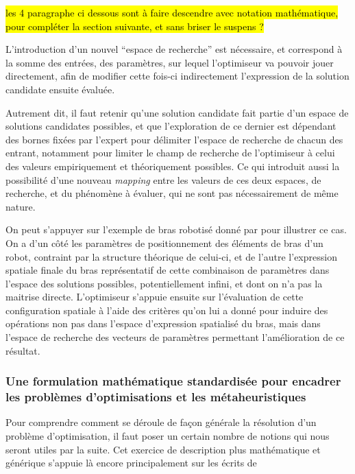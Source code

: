 \hl{les 4 paragraphe ci dessous sont à faire descendre avec notation mathématique, pour compléter la section suivante, et sans briser le suspens ?}

L'introduction d'un nouvel \enquote{espace de recherche} est nécessaire, et  correspond à la somme des entrées, des paramètres, sur lequel l'optimiseur va pouvoir jouer directement, afin de modifier cette fois-ci indirectement l'expression de la solution candidate ensuite évaluée.

Autrement dit, il faut retenir qu'une solution candidate fait partie d'un espace de solutions candidates possibles, et que l'exploration de ce dernier est dépendant des bornes fixées par l'expert pour délimiter l'espace de recherche de chacun des entrant, notamment pour limiter le champ de recherche de l'optimiseur à celui des valeurs empiriquement et théoriquement possibles. Ce qui introduit aussi la possibilité d'une nouveau \textit{mapping} entre les valeurs de ces deux espaces, de recherche, et du phénomène à évaluer, qui ne sont pas nécessairement de même nature.

On peut s'appuyer sur l'exemple de bras robotisé donné par \autocite{Weise2011} pour illustrer ce cas. On a d'un côté les paramètres de positionnement des éléments de bras d'un robot, contraint par la structure théorique de celui-ci, et de l'autre l'expression spatiale finale du bras représentatif de cette combinaison de paramètres dans l'espace des solutions possibles, potentiellement infini, et dont on n'a pas la maitrise directe. L'optimiseur s'appuie ensuite sur l'évaluation de cette configuration spatiale à l'aide des critères qu'on lui a donné pour induire des opérations non pas dans l'espace d'expression spatialisé du bras, mais dans l'espace de recherche des vecteurs de paramètres permettant l'amélioration de ce résultat.

\subsubsection{Une formulation mathématique standardisée pour encadrer les problèmes d'optimisations et les métaheuristiques}
\label{sssec:math_opti}


Pour comprendre comment se déroule de façon générale la résolution d'un problème d'optimisation, il faut poser un certain nombre de notions qui nous seront utiles par la suite. Cet exercice de description plus mathématique et générique s'appuie là encore principalement sur les écrits de \textcite{Weise2011}

